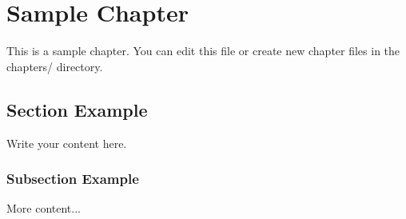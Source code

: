 \chapter{Sample Chapter}

This is a sample chapter. You can edit this file or create new chapter files in the chapters/ directory.

\section{Section Example}

Write your content here.

\subsection{Subsection Example}

More content...